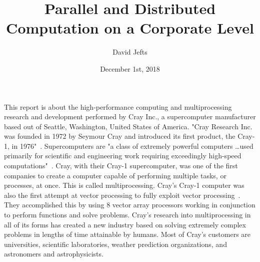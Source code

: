\documentclass[12pt, letterpaper]{article}
\begin{document}
\title{Parallel and Distributed Computation on a Corporate Level}
\author{David Jefts}
\date{December 1st, 2018}
\begin{titlepage}
	\centering
	\maketitle
	\centering
	\noindent{} %
	\hfill
	\vfill
\end{titlepage}


\setcounter{secnumdepth}{-1}
\linespread{1.5}
\onehalfspacing

\section{}
	This report is about the high-performance computing and multiprocessing research and development performed by Cray Inc., a supercomputer manufacturer based out of Seattle, Washington, United States of America. "Cray Research Inc. was founded in 1972 by Seymour Cray and introduced its first product, the Cray-1, in 1976"~\cite{sec}. Supercomputers are "a class of extremely powerful computers \ldots used primarily for scientific and engineering work requiring exceedingly high-speed computations"~\cite{supercomputer}. Cray, with their Cray-1 supercomputer, was one of the first companies to create a computer capable of performing multiple tasks, or processes, at once. This is called multiprocessing. Cray's Cray-1 computer was also the first attempt at vector processing to fully exploit vector processing~\cite{cray-1}. They accomplished this by using 8 vector array processors working in conjunction to perform functions and solve problems. Cray's research into multiprocessing in all of its forms has created a new industry based on solving extremely complex problems in lengths of time attainable by humans. Most of Cray's customers are universities, scientific laboratories, weather prediction organizations, and astronomers and astrophysicists.
\end{document}
